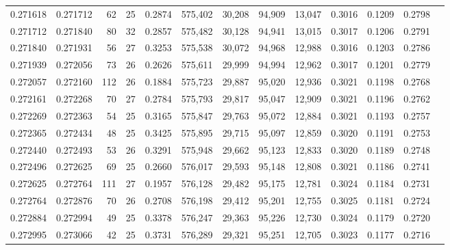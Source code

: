 \begin{tabular}{rrrrrrrrrrrrr}
0.271618 & 0.271712 &  62 &  25 &                                     0.2874 & 575,402 &  30,208 &  94,909 &  13,047 & 0.3016 & 0.1209 & 0.2798 \\
0.271712 & 0.271840 &  80 &  32 &                                     0.2857 & 575,482 &  30,128 &  94,941 &  13,015 & 0.3017 & 0.1206 & 0.2791 \\
0.271840 & 0.271931 &  56 &  27 &                                     0.3253 & 575,538 &  30,072 &  94,968 &  12,988 & 0.3016 & 0.1203 & 0.2786 \\
0.271939 & 0.272056 &  73 &  26 &                                     0.2626 & 575,611 &  29,999 &  94,994 &  12,962 & 0.3017 & 0.1201 & 0.2779 \\
0.272057 & 0.272160 & 112 &  26 &                                     0.1884 & 575,723 &  29,887 &  95,020 &  12,936 & 0.3021 & 0.1198 & 0.2768 \\
0.272161 & 0.272268 &  70 &  27 &                                     0.2784 & 575,793 &  29,817 &  95,047 &  12,909 & 0.3021 & 0.1196 & 0.2762 \\
0.272269 & 0.272363 &  54 &  25 &                                     0.3165 & 575,847 &  29,763 &  95,072 &  12,884 & 0.3021 & 0.1193 & 0.2757 \\
0.272365 & 0.272434 &  48 &  25 &                                     0.3425 & 575,895 &  29,715 &  95,097 &  12,859 & 0.3020 & 0.1191 & 0.2753 \\
0.272440 & 0.272493 &  53 &  26 &                                     0.3291 & 575,948 &  29,662 &  95,123 &  12,833 & 0.3020 & 0.1189 & 0.2748 \\
0.272496 & 0.272625 &  69 &  25 &                                     0.2660 & 576,017 &  29,593 &  95,148 &  12,808 & 0.3021 & 0.1186 & 0.2741 \\
0.272625 & 0.272764 & 111 &  27 &                                     0.1957 & 576,128 &  29,482 &  95,175 &  12,781 & 0.3024 & 0.1184 & 0.2731 \\
0.272764 & 0.272876 &  70 &  26 &                                     0.2708 & 576,198 &  29,412 &  95,201 &  12,755 & 0.3025 & 0.1181 & 0.2724 \\
0.272884 & 0.272994 &  49 &  25 &                                     0.3378 & 576,247 &  29,363 &  95,226 &  12,730 & 0.3024 & 0.1179 & 0.2720 \\
0.272995 & 0.273066 &  42 &  25 &                                     0.3731 & 576,289 &  29,321 &  95,251 &  12,705 & 0.3023 & 0.1177 & 0.2716 \\

\end{tabular}
